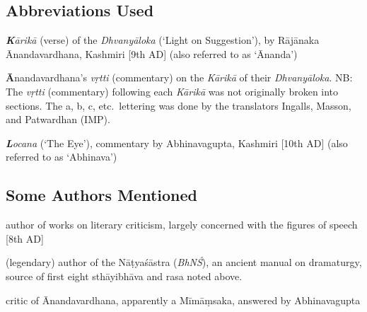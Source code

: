 \documentclass[10pt]{article}
\begin{document}
\subsection{Abbreviations Used}

\begin{description}
	\setlength{\itemsep}{-0.25em}

	\item[K] \textit{\textbf{K}ārikā} (verse) of the \textit{Dhvanyāloka} (`Light on Suggestion'),
	      by Rājānaka \\ Ānandavardhana, Kashmiri [9th AD] (also referred to as `Ānanda')%

	\item[A] \textbf{Ā}nandavardhana's \textit{vṛtti} (commentary) on the \textit{Kārikā} of their \textit{Dhvanyāloka}. NB: The \textit{vṛtti} (commentary) following each \textit{Kārikā} was not originally broken into sections. The a, b, c, etc.\ lettering was done by the translators Ingalls, Masson, and Patwardhan (IMP).

	\item[L] \textit{\textbf{L}ocana} (`The Eye'), commentary by Abhinavagupta, Kashmiri [10th AD]  (also referred to as `Abhinava')
\end{description}


\subsection{Some Authors Mentioned}


\begin{description}
	\setlength{\itemsep}{-0.25em}

	\item[Bhāmaha] author of works on literary criticism, largely concerned with the figures of speech [8th AD]

	\item[Bharata] (legendary) author of the Nāṭyaśāstra (\textit{BhNŚ}), an ancient manual on dramaturgy, source of first eight sthāyibhāva and rasa noted above.

	\item[Bhaṭṭanāyaka] critic of Ānandavardhana, apparently a Mīmāṃsaka, answered by Abhinavagupta
\end{description}
\end{document}
